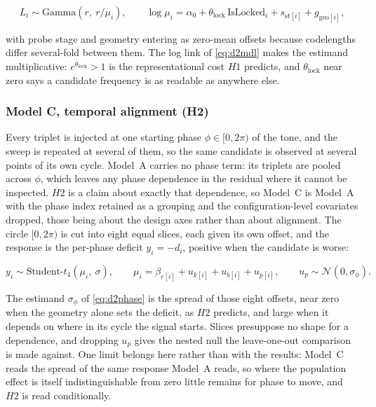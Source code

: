 \begin{equation}
\label{eq:d2mdl}
L_i \sim \text{Gamma}\!\left(r,\ r/\mu_i\right),
\qquad
\log \mu_i = \alpha_0 + \theta_{\mathrm{lock}}\,\mathrm{IsLocked}_i + s_{\text{st}[i]} + g_{\text{geo}[i]},
\end{equation}

with probe stage and geometry entering as zero-mean offsets because codelengths differ several-fold between them. The log link of \autoref{eq:d2mdl} makes the estimand multiplicative: $e^{\theta_{\mathrm{lock}}}>1$ is the representational cost $H1$ predicts, and $\theta_{\mathrm{lock}}$ near zero says a candidate frequency is as readable as anywhere else.

\subsubsection*{Model C, temporal alignment (H2)}
Every triplet is injected at one starting phase $\phi\in[0,2\pi)$ of the tone, and the sweep is repeated at several of them, so the same candidate is observed at several points of its own cycle. Model~A carries no phase term: its triplets are pooled across $\phi$, which leaves any phase dependence in the residual where it cannot be inspected. $H2$ is a claim about exactly that dependence, so Model~C is Model~A with the phase index retained as a grouping and the configuration-level covariates dropped, those being about the design axes rather than about alignment. The circle $[0,2\pi)$ is cut into eight equal slices, each given its own offset, and the response is the per-phase deficit $y_i=-d_i$, positive when the candidate is worse:

\begin{equation}
\label{eq:d2phase}
y_i \sim \text{Student-}t_4(\mu_i,\ \sigma),
\qquad
\mu_i = \beta_{c[i]} + u_{k[i]} + u_{b[i]} + u_{p[i]},
\qquad
u_p \sim \mathcal{N}(0, \sigma_\phi).
\end{equation}

The estimand $\sigma_\phi$ of \autoref{eq:d2phase} is the spread of those eight offsets, near zero when the geometry alone sets the deficit, as $H2$ predicts, and large when it depends on where in its cycle the signal starts. Slices presuppose no shape for a dependence, and dropping $u_p$ gives the nested null the leave-one-out comparison is made against. One limit belongs here rather than with the results: Model~C reads the spread of the same response Model~A reads, so where the population effect is itself indistinguishable from zero little remains for phase to move, and $H2$ is read conditionally.

